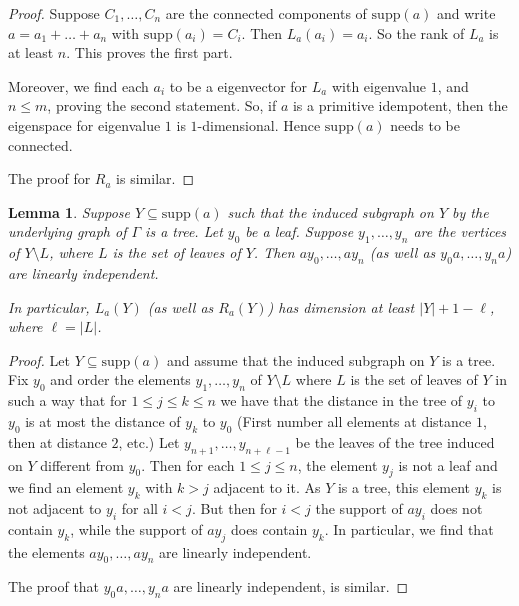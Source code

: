 \documentclass[oneside,a4paper]{amsart} %
\newtheorem{lemma}[proposition]{Lemma}
\theoremstyle{definition}
\begin{document}
\begin{proof}
Suppose $C_1,\dots, C_n$ are the connected components of  $\mathrm{supp}(a)$
and write $a=a_1+\dots +a_n$ with $\mathrm{supp}(a_i)=C_i$.
Then $L_a(a_i)=a_i$. 
So the rank of $L_a$ is at least $n$.
This proves the first part.



Moreover, we find each $a_i$ to be a eigenvector for $L_a$ with eigenvalue $1$, and $n\leq m$, proving the second statement.
So, if $a$ is a primitive idempotent, then the eigenspace  for eigenvalue $1$ is $1$-dimensional.
Hence $\mathrm{supp}(a)$ needs to be connected.

The proof for $R_a$ is similar.
\end{proof}

\begin{lemma}\label{treeindep}\label{treebound}
Suppose $Y\subseteq \mathrm{supp}(a)$ such that the induced subgraph on $Y$ by the underlying graph of $\Gamma$ is a tree.
Let $y_0$ be a leaf. Suppose $y_1, \dots, y_n$ are the vertices of $Y\setminus L$, where $L$ is the set of leaves of $Y$.
Then $ay_0,\dots, ay_n$ (as well as $y_0a,\dots, y_na$) are linearly independent.

In particular,  $L_a(Y)$ (as well as $R_a(Y)$) has dimension  at least $|Y|+1-\ell$,
where $\ell=|L|$.
\end{lemma}

\begin{proof}
Let $Y\subseteq \mathrm{supp}(a)$ and assume that the induced subgraph on $Y$ is a tree.
Fix $y_0$ and order the elements $y_1, \dots, y_n$ of $Y\setminus L$ where $L$ is the set of leaves of $Y$
in such a way that for $1\leq j\leq k\leq n$ we have that the distance in the tree of $y_i$ to $y_0$ is at most the distance of $y_k$ to $y_0$
(First number all elements at distance $1$, then at distance $2$, etc.)
Let $y_{n+1},\dots, y_{n+\ell-1}$ be the  leaves of the tree induced on $Y$ different from $y_0$.
Then for each $1\leq j\leq n$, the element $y_j$ is not a leaf and we find
an element $y_k$ with $k>j$
adjacent to it.
As $Y$ is a tree, this element $y_k$ is not adjacent to $y_i$ for all $i< j$.
But then  for $i< j$ the support of $ay_i$ does not contain $y_k$, while the support of
$ay_j$ does contain $y_k$.
In particular, we find that the elements $ay_0,\dots, ay_n$ are linearly independent.

The proof that $y_0a,\dots, y_na$ are linearly independent, is similar.
\end{proof}
\end{document}
